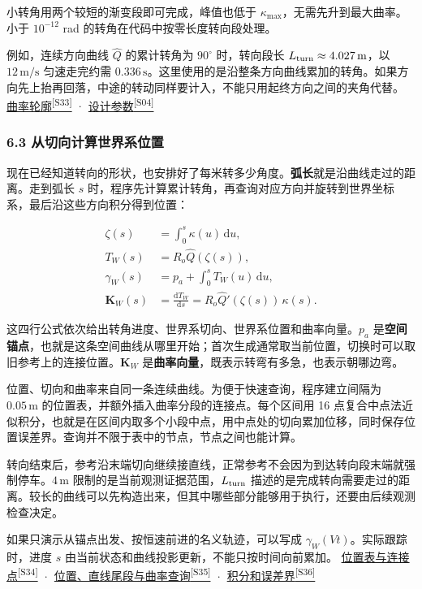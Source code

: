 \documentclass[11pt,a4paper]{article}
\numberwithin{equation}{topic}
\newcommand{\sourceref}[2]{\hyperlink{source-#1}{#2\textsuperscript{[#1]}}}
\begin{document}
小转角用两个较短的渐变段即可完成，峰值也低于 \(\kappa_{\max}\)，无需先升到最大曲率。小于 \(10^{-12}\) rad 的转角在代码中按零长度转向段处理。

例如，连续方向曲线 \(\widehat Q\) 的累计转角为 \(90^\circ\) 时，转向段长 \(L_{\rm turn}\approx4.027\,\mathrm m\)，以 \(12\,\mathrm{m/s}\) 匀速走完约需 \(0.336\,\mathrm s\)。这里使用的是沿整条方向曲线累加的转角。如果方向先上抬再回落，中途的转动同样要计入，不能只用起终方向之间的夹角代替。 \sourceref{S33}{曲率轮廓} · \sourceref{S04}{设计参数}

\subsubsection*{6.3 从切向计算世界系位置}

现在已经知道转向的形状，也安排好了每米转多少角度。\textbf{弧长}就是沿曲线走过的距离。走到弧长 \(s\) 时，程序先计算累计转角，再查询对应方向并旋转到世界坐标系，最后沿这些方向积分得到位置：

\begin{equation}
\label{eq:spatial}
\begin{aligned}
\zeta(s)&=\int_0^s \kappa(u)\,\mathrm du,\\
T_W(s)&=R_o\widehat Q(\zeta(s)),\\
\gamma_W(s)&=p_a+\int_0^s T_W(u)\,\mathrm du,\\
\mathbf K_W(s)&=\frac{\mathrm dT_W}{\mathrm ds}
=R_o\widehat Q'(\zeta(s))\,\kappa(s).
\end{aligned}
\end{equation}

这四行公式依次给出转角进度、世界系切向、世界系位置和曲率向量。\(p_a\) 是\textbf{空间锚点}，也就是这条空间曲线从哪里开始；首次生成通常取当前位置，切换时可以取旧参考上的连接位置。\(\mathbf K_W\) 是\textbf{曲率向量}，既表示转弯有多急，也表示朝哪边弯。

位置、切向和曲率来自同一条连续曲线。为便于快速查询，程序建立间隔为 \(0.05\,\mathrm m\) 的位置表，并额外插入曲率分段的连接点。每个区间用 16 点复合中点法近似积分，也就是在区间内取多个小段中点，用中点处的切向累加位移，同时保存位置误差界。查询并不限于表中的节点，节点之间也能计算。

转向结束后，参考沿末端切向继续接直线，正常参考不会因为到达转向段末端就强制停车。\(4\,\mathrm m\) 限制的是当前观测证据范围，\(L_{\rm turn}\) 描述的是完成转向需要走过的距离。较长的曲线可以先构造出来，但其中哪些部分能够用于执行，还要由后续观测检查决定。

如果只演示从锚点出发、按恒速前进的名义轨迹，可以写成 \(\gamma_W(Vt)\)。实际跟踪时，进度 \(s\) 由当前状态和曲线投影更新，不能只按时间向前累加。 \sourceref{S34}{位置表与连接点} · \sourceref{S35}{位置、直线尾段与曲率查询} · \sourceref{S36}{积分和误差界}
\end{document}
